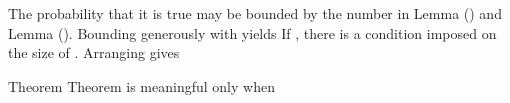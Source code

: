 The probability that it is true may be bounded by the number in Lemma () and Lemma ().
Bounding generously with  yields
If , there is a condition imposed on the size of .
Arranging gives

\Result
{Theorem}
{
Theorem is meaningful only when
}

\stopsection

\stopchapter
